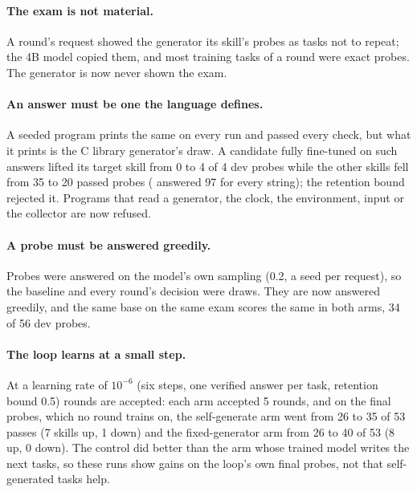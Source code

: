 \paragraph{The exam is not material.} A round's request showed the generator its skill's
probes as tasks not to repeat; the 4B model copied them, and most training tasks of a
round were exact probes. The generator is now never shown the exam.

\paragraph{An answer must be one the language defines.} A seeded 
program prints the same on every run and passed every check, but what it prints is the C
library generator's draw. A candidate fully fine-tuned on such answers lifted its target
skill from 0 to 4 of 4 dev probes while the other skills fell from 35 to 20 passed probes
( answered 97 for every string); the retention bound rejected
it.
Programs that read a generator, the clock, the environment, input or the collector are
now refused.

\paragraph{A probe must be answered greedily.} Probes were answered on the model's own
sampling (0.2, a seed per request), so the baseline and every round's decision were draws.
They are now answered greedily, and the same base on the same exam scores the same in both
arms, 34 of 56 dev probes.

\paragraph{The loop learns at a small step.} At a learning rate of $10^{-6}$ (six steps,
one verified answer per task, retention bound 0.5) rounds are accepted: each arm accepted 5
rounds, and on the final probes, which no round trains on, the self-generate arm went from
26 to 35 of 53 passes (7 skills up, 1 down) and the fixed-generator arm from 26 to 40 of 53
(8 up, 0 down). The control did better than the arm whose trained model writes the
next tasks, so these runs show gains on the loop's own final probes, not that self-generated tasks
help.

